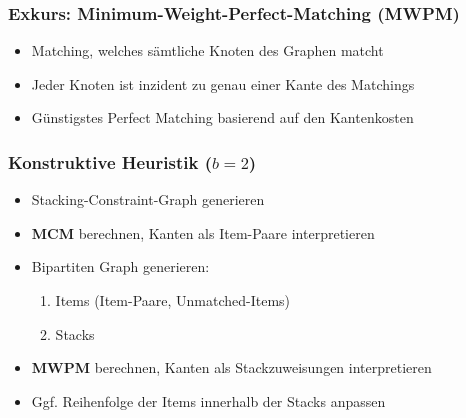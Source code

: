 \documentclass{beamer}
\begin{document}
\begin{frame}
\frametitle{Exkurs: Minimum-Weight-Perfect-Matching (\textsc{MWPM})}
\begin{itemize}
  \item Matching, welches sämtliche Knoten des Graphen matcht
  \item Jeder Knoten ist inzident zu genau einer Kante des Matchings
  \item Günstigstes Perfect Matching basierend auf den Kantenkosten
\end{itemize}
\begin{figure}[H]
\centering
{}
\end{figure}
\end{frame}

\begin{frame}
\frametitle{Konstruktive Heuristik ($b = 2$)}

\begin{itemize}
  \item Stacking-Constraint-Graph generieren
  \item \textsc{\textbf{MCM}} berechnen, Kanten als Item-Paare interpretieren
  \item Bipartiten Graph generieren:
  \begin{enumerate}
    \item Items (Item-Paare, Unmatched-Items)
    \item Stacks
  \end{enumerate}
  \item \textsc{\textbf{MWPM}} berechnen, Kanten als Stackzuweisungen interpretieren
  \item Ggf. Reihenfolge der Items innerhalb der Stacks anpassen
\end{itemize}
\end{frame}
\end{document}
